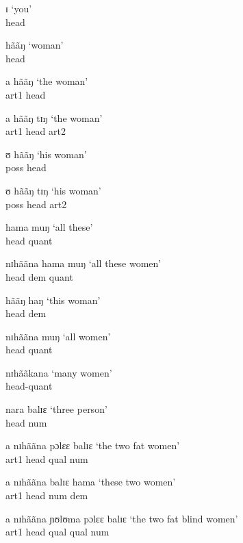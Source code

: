 \begin{exe}
  \ex\label{ex:GRM-np-list} 
 \begin{xlist}
 
  \ex\label{ex:GRM-pro} 
ɪ   `you' \\ {\sc head}

  \ex\label{ex:GRM-h} 
hããŋ   `woman' \\ 
{\sc head} 

  \ex\label{ex:GRM-ah} 
a hããŋ  `the woman'  \\  
{\sc art1} {\sc head} 

  \ex\label{ex:GRM-aha}
a hããŋ tɪŋ   `the woman'   \\  
{\sc art1} {\sc head} {\sc art2}

  \ex\label{ex:GRM-ph} 
ʊ hããŋ  `his woman'  \\ 
 {\sc poss}  {\sc head}

  \ex\label{ex:GRM-pha} 
ʊ hããŋ tɪŋ  `his woman' \\
 {\sc poss} {\sc head} {\sc art2}  

 \ex\label{ex:GRM-dhq}
hama muŋ  `all these'  \\  
{\sc head} {\sc quant}  

 \ex\label{ex:GRM-hdq}
 nɪhããna hama muŋ  `all these women'  \\ 
  {\sc head} {\sc dem} {\sc quant}  

  \ex\label{ex:GRM-hd} 
hããŋ haŋ  `this woman'  \\ 
  {\sc head} {\sc dem}  

  \ex\label{ex:GRM-hq-all} 
 nɪhããna muŋ   `all women'  \\  
{\sc head} {\sc quant}  

\ex\label{ex:GRM-hq-many} 
 nɪhããkana   `many women' \\   
{\sc head-quant}  

  \ex\label{ex:GRM-hn} 
nara balɪɛ   `three person' \\  
  {\sc head} {\sc num}  

  \ex\label{ex:GRM-ahqln} 
a nɪhããna pɔlɛɛ balɪɛ  `the two fat women'  \\ 
 {\sc art1} {\sc head} {\sc qual} {\sc num}  

  \ex\label{ex:GRM-ahqlnd} 
a nɪhããna balɪɛ hama  `these two women' \\ 
 {\sc art1} {\sc head} {\sc num} {\sc dem}  

  \ex\label{ex:GRM-ahqlqln}
 a nɪhããna ɲʊlʊma pɔlɛɛ balɪɛ  `the two fat blind women'  \\
  {\sc art1} {\sc head}  {\sc qual} {\sc qual}  {\sc num}  


\end{xlist}
\end{exe}
